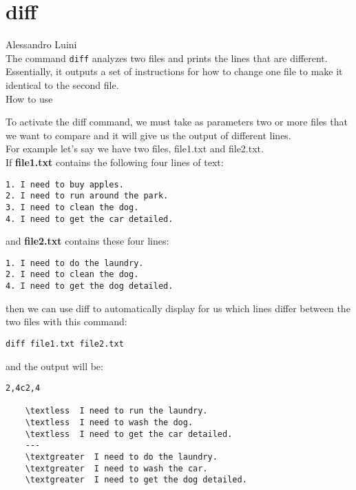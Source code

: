 \documentclass[hidelinks,12pt,a4paper,numbers=enddot]{scrartcl}
\begin{document}
\section{diff}


\large Alessandro Luini \normalsize\\



The command \texttt{diff} analyzes two files and prints the lines that are different.
Essentially, it outputs a set of instructions for how to change one file to
make it identical to the second file.\\

How to use

To activate the diff command, we must take as parameters two or more
files that we want to compare and it will give us the output of
different lines.\\
For example let's say we have two files, file1.txt and file2.txt.\\
If \textbf{file1.txt} contains the following four lines of text:

\begin{verbatim}
1. I need to buy apples.
2. I need to run around the park.
3. I need to clean the dog.
4. I need to get the car detailed.
\end{verbatim}

and \textbf{file2.txt} contains these four lines:

\begin{verbatim}
1. I need to do the laundry.
2. I need to clean the dog.
4. I need to get the dog detailed.
\end{verbatim}

then we can use diff to automatically display for us which lines differ
between the two files with this command:

\begin{verbatim}
diff file1.txt file2.txt
\end{verbatim}

and the output will be:

\begin{verbatim}
2,4c2,4

    \textless  I need to run the laundry.
    \textless  I need to wash the dog.
    \textless  I need to get the car detailed.
    ---
    \textgreater  I need to do the laundry.
    \textgreater  I need to wash the car.
    \textgreater  I need to get the dog detailed.
\end{verbatim}
\end{document}
